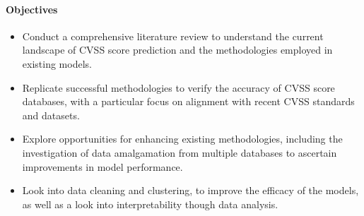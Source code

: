 \documentclass[12pt]{article}
\begin{document}
\paragraph{Objectives}
\begin{itemize}[noitemsep]

	\item Conduct a comprehensive literature review to understand the current landscape of CVSS
	      score prediction and the methodologies employed in existing models.

	\item Replicate successful methodologies to verify the accuracy of CVSS score databases, with a
	      particular focus on alignment with recent CVSS standards and datasets.

	\item Explore opportunities for enhancing existing methodologies, including the investigation of
	      data amalgamation from multiple databases to ascertain improvements in model performance.

	\item Look into data cleaning and clustering, to improve the efficacy of the models, as well as
	      a look into interpretability though data analysis.

\end{itemize}
\end{document}
